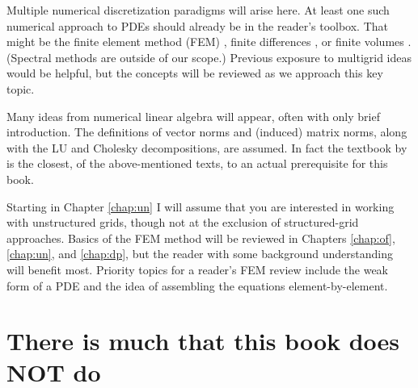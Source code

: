 Multiple numerical discretization paradigms will arise here.  At least one such numerical approach to PDEs should already be in the reader's toolbox.  That might be the finite element method (FEM) \citep{Braess2007,Elmanetal2005,KarniadakisSherwin2013}, finite differences \citep{LeVeque2007,MortonMayers2005}, or finite volumes \citep{LeVeque2002}.  (Spectral methods \citep{Trefethen2000} are outside of our scope.)  Previous exposure to multigrid ideas \citep{Briggsetal2000} would be helpful, but the concepts will be reviewed as we approach this key topic.

Many ideas from numerical linear algebra \citep{Greenbaum1997,TrefethenBau1997} will appear, often with only brief introduction.  The definitions of vector norms and (induced) matrix norms, along with the LU and Cholesky decompositions, are assumed.  In fact the textbook by \citet{TrefethenBau1997} is the closest, of the above-mentioned texts, to an actual prerequisite for this book.

Starting in Chapter \ref{chap:un} I will assume that you are interested in working with unstructured grids, though not at the exclusion of structured-grid approaches.  Basics of the FEM method will be reviewed in Chapters \ref{chap:of}, \ref{chap:un}, and \ref{chap:dp}, but the reader with some background understanding will benefit most.  Priority topics for a reader's FEM review include the weak form of a PDE and the idea of assembling the equations element-by-element.


\section{There is much that this book does NOT do}


